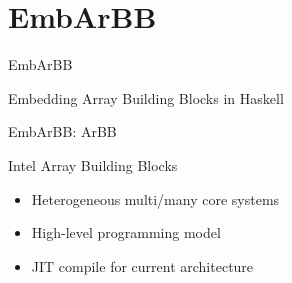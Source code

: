 \documentclass[xcolor=dvipsnames]{beamer}
\begin{document}
%
\section{EmbArBB} 

\begin{frame}{EmbArBB} 
 \begin{center}
   {\Large Embedding Array Building Blocks in Haskell}
 \end{center}

\end{frame} 

%

\begin{frame}{EmbArBB: ArBB} 

  Intel Array Building Blocks
  \begin{itemize}
    \item Heterogeneous multi/many core systems
    \item High-level programming model 
    \item JIT compile for current architecture   
  \end{itemize}
\end{frame} 
\end{document}
